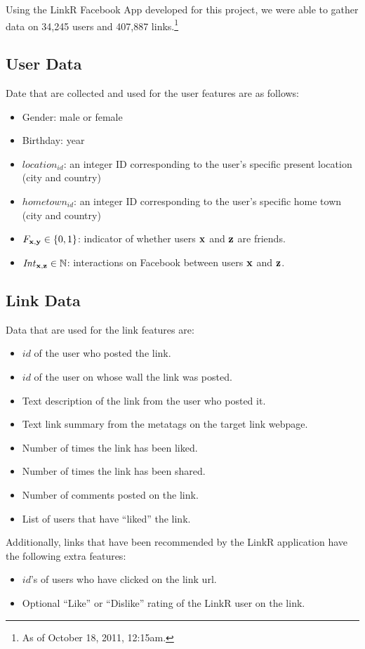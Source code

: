 \label{sec:dataset}

Using the LinkR Facebook App developed for this project, we were able
to gather data on 34,245 users and 407,887 links.\footnote{As of
October 18, 2011, 12:15am.}

\subsection{User Data}

Date that are collected and used for the user features are as follows:
\begin{itemize}
\item {Gender:} male or female
\item {Birthday:} year
\item {$\mathit{location}_\mathit{id}$:} an integer ID corresponding
to the user's specific present location (city and country)
\item {$\mathit{hometown}_\mathit{id}$:} an integer ID corresponding
to the user's specific home town (city and country)
\item {$F_{\mathbf{x},\mathbf{y}} \in \{ 0, 1\}$:} indicator of whether 
users $\mathbf{x}$ and $\mathbf{z}$ are friends.
\item {$\mathit{Int}_{\mathbf{x},\mathbf{z}} \in \mathbb{N}$:} interactions on
Facebook between users $\mathbf{x}$ and $\mathbf{z}$.
\end{itemize}

\subsection{Link Data}

Data that are used for the link features are:
\begin{itemize}
\item{$\mathit{id}$ of the user who posted the link.}
\item{$\mathit{id}$ of the user on whose wall the link was posted.}
\item{Text description of the link from the user who posted it.}
\item{Text link summary from the metatags on the target link webpage.}
\item{Number of times the link has been liked.}
\item{Number of times the link has been shared.}
\item{Number of comments posted on the link}.
\item{List of users that have ``liked'' the link.}
\end{itemize}
Additionally, links that have been recommended by the LinkR
application have the following extra features:
\begin{itemize}
\item{$\mathit{id}$'s of users who have clicked on the link url.}
\item{Optional ``Like'' or ``Dislike'' rating of the LinkR user on the link.}
\end{itemize}

